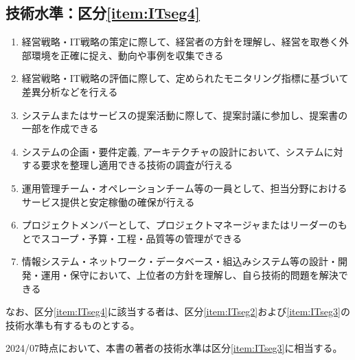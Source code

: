 \clearpage
\subsection{技術水準：区分\ref{item:ITseg4}}
\begin{enumerate}[label=\sarrow]
\item {}経営戦略・IT戦略の策定に際して、経営者の方針を理解し、経営を取巻く外部環境を正確に捉え、動向や事例を収集できる
\item 経営戦略・IT戦略の評価に際して、定められたモニタリング指標に基づいて差異分析などを行える
\item システムまたはサービスの提案活動に際して、提案討議に参加し、提案書の一部を作成できる
\item システムの企画・要件定義, アーキテクチャの設計において、システムに対する要求を整理し適用できる技術の調査が行える
\item 運用管理チーム・オペレーションチーム等の一員として、担当分野におけるサービス提供と安定稼働の確保が行える
\item プロジェクトメンバーとして、プロジェクトマネージャまたはリーダーのもとでスコープ・予算・工程・品質等の管理ができる
\item {}情報システム・ネットワーク・データベース・組込みシステム等の設計・開発・運用・保守において、上位者の方針を理解し、自ら技術的問題を解決できる
\end{enumerate}
なお、区分\ref{item:ITseg4}\hx に該当する者は、区分\ref{item:ITseg2}\hx および\ref{item:ITseg3}\hx の技術水準も有するものとする。
\begin{marker}
2024/07時点において、本書の著者の技術水準は区分\ref{item:ITseg3}\hx に相当する。
\end{marker}
